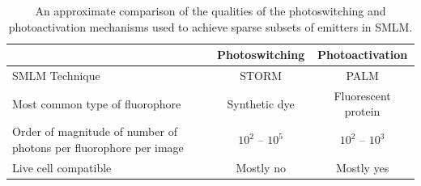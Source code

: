 \documentclass[10pt,a4paper]{book}
\begin{document}
\begin{table}
    \centering
    \begin{tabular}{ |p{4cm}|c|c| } 
        \hline
        & Photoswitching & Photoactivation \\
        \hline 
        SMLM Technique & STORM & PALM \\
        \hline
        Most common type of fluorophore & Synthetic dye & Fluorescent protein \\
        \hline
        Order of magnitude of number of photons per fluorophore per image & $10^2$ -- $10^5$ & $10^2$ -- $10^3$ \\
        \hline
        Live cell compatible & Mostly no & Mostly yes \\
        \hline
    \end{tabular}
    \caption{An approximate comparison of the qualities of the photoswitching and photoactivation mechanisms used to achieve sparse subsets of emitters in SMLM.}
    \label{table:photophysics-comparison}
\end{table}
\end{document}

